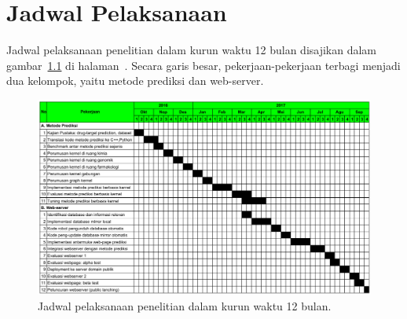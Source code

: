 \chapter{Jadwal Pelaksanaan}
Jadwal pelaksanaan penelitian dalam kurun waktu 12 bulan disajikan dalam gambar~\ref{fig:timeline} di halaman~\pageref{fig:timeline}.
Secara garis besar, pekerjaan-pekerjaan terbagi menjadi dua kelompok, yaitu metode prediksi dan web-server.

\begin{landscape}
\begin{figure}
	\centering
	\includegraphics[scale=0.8, angle=0]{pics/timeline.png}
 	\caption{Jadwal pelaksanaan penelitian dalam kurun waktu 12 bulan.}
  	\label{fig:timeline}
\end{figure}  
\end{landscape}
